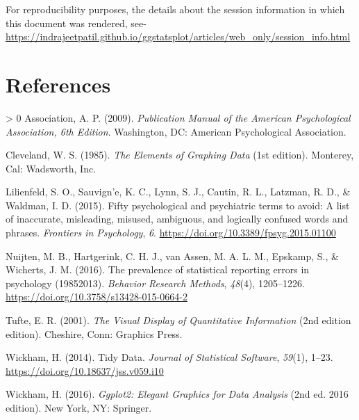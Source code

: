 \documentclass[
]{article}
\newlength{\cslhangindent}
\newenvironment{CSLReferences}[3] %
 {%
  \setlength{\parindent}{0pt}
  \ifodd #1 \everypar{\setlength{\hangindent}{\cslhangindent}}\ignorespaces\fi
  \ifnum #2 > 0
  \setlength{\parskip}{#2\baselineskip}
  \fi
 }%
 {}
\begin{document}
For reproducibility purposes, the details about the session information in which
this document was rendered, see-
\url{https://indrajeetpatil.github.io/ggstatsplot/articles/web_only/session_info.html}

\newpage

\hypertarget{references}{%
\section*{References}\label{references}}

\hypertarget{refs}{}
\begin{CSLReferences}{1}{0}
\leavevmode\hypertarget{ref-associationPublicationManualAmerican2009}{}%
Association, A. P. (2009). \emph{Publication {Manual} of the {American Psychological Association}, 6th {Edition}}. {Washington, DC}: {American Psychological Association}.

\leavevmode\hypertarget{ref-clevelandElementsGraphingData1985}{}%
Cleveland, W. S. (1985). \emph{The {Elements} of {Graphing Data}} (1st edition). {Monterey, Cal}: {Wadsworth, Inc.}

\leavevmode\hypertarget{ref-lilienfeldFiftyPsychologicalPsychiatric2015}{}%
Lilienfeld, S. O., Sauvign'e, K. C., Lynn, S. J., Cautin, R. L., Latzman, R. D., \& Waldman, I. D. (2015). Fifty psychological and psychiatric terms to avoid: A list of inaccurate, misleading, misused, ambiguous, and logically confused words and phrases. \emph{Frontiers in Psychology}, \emph{6}. \url{https://doi.org/10.3389/fpsyg.2015.01100}

\leavevmode\hypertarget{ref-nuijtenPrevalenceStatisticalReporting2016}{}%
Nuijten, M. B., Hartgerink, C. H. J., van Assen, M. A. L. M., Epskamp, S., \& Wicherts, J. M. (2016). The prevalence of statistical reporting errors in psychology (1985{}2013). \emph{Behavior Research Methods}, \emph{48}(4), 1205--1226. \url{https://doi.org/10.3758/s13428-015-0664-2}

\leavevmode\hypertarget{ref-tufteVisualDisplayQuantitative2001}{}%
Tufte, E. R. (2001). \emph{The {Visual Display} of {Quantitative Information}} (2nd edition edition). {Cheshire, Conn}: {Graphics Press}.

\leavevmode\hypertarget{ref-wickhamTidyData2014}{}%
Wickham, H. (2014). Tidy {Data}. \emph{Journal of Statistical Software}, \emph{59}(1), 1--23. \url{https://doi.org/10.18637/jss.v059.i10}

\leavevmode\hypertarget{ref-wickhamGgplot2ElegantGraphics2016}{}%
Wickham, H. (2016). \emph{Ggplot2: {Elegant Graphics} for {Data Analysis}} (2nd ed. 2016 edition). {New York, NY}: {Springer}.

\end{CSLReferences}
\end{document}
